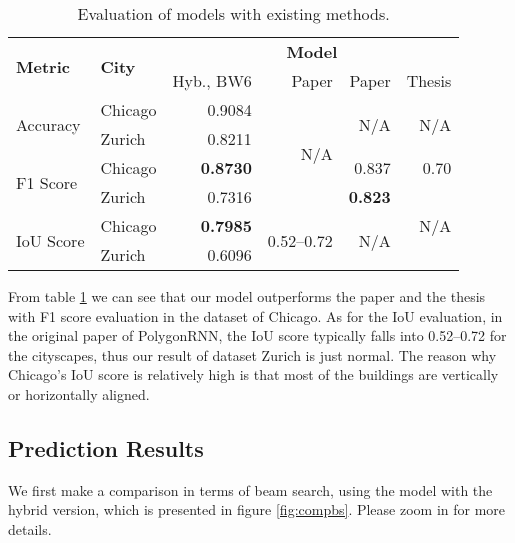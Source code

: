 \begin{table}[!h]
	\centering
	\caption[Evaluation of models with existing methods]{Evaluation of models with existing methods.}
	\label{tab:evalmodex}
	\begin{tabular}{l|l|r|r|r|r}
	\hline
	\multirow{2}{*}{\textbf{Metric}} & \multirow{2}{*}{\textbf{City}} & \multicolumn{4}{c}{\textbf{Model}} \\ \cline{3-6}
	 & & Hyb., BW6\footnotemark[1] & Paper \cite{polygonrnn} & Paper \cite{mspascal} & Thesis \cite{msnadine} \\ \hline
	\multirow{2}{*}{Accuracy} & Chicago & 0.9084 & \multirow{4}{*}{N/A} & \multirow{2}{*}{N/A} & \multirow{2}{*}{N/A} \\ \cline{2-3}
	& Zurich & 0.8211 & & \\ \cline{1-3}\cline{5-6}
	\multirow{2}{*}{F1 Score} & Chicago & \textbf{0.8730} & & 0.837\footnotemark[2] & 0.70 \\ \cline{2-3}\cline{5-6}
	& Zurich & 0.7316 & & \textbf{0.823}\footnotemark[2] & \multirow{3}{*}{N/A} \\ \cline{1-5}
	\multirow{2}{*}{IoU Score} & Chicago & \textbf{0.7985} & \multirow{2}{*}{0.52--0.72\footnotemark[3]} & \multirow{2}{*}{N/A} & \\ \cline{2-3}
	& Zurich & 0.6096 & & & \\
	\hline
\end{tabular}
\end{table}

From table \ref{tab:evalmodex} we can see that our model outperforms the paper \cite{mspascal} and the thesis \cite{msnadine} with F1 score evaluation in the dataset of Chicago. As for the IoU evaluation, in the original paper of PolygonRNN, the IoU score typically falls into 0.52--0.72 for the cityscapes, thus our result of dataset Zurich is just normal. The reason why Chicago’s IoU score is relatively high is that most of the buildings are vertically or horizontally aligned.

\pagebreak

\subsection{Prediction Results}\label{predres}
We first make a comparison in terms of beam search, using the model with the hybrid version, which is presented in figure \ref{fig:compbs}. Please zoom in for more details.

